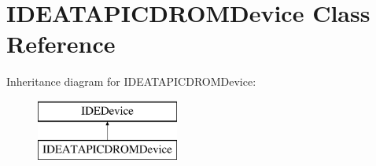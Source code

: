 \hypertarget{classIDEATAPICDROMDevice}{\section{I\-D\-E\-A\-T\-A\-P\-I\-C\-D\-R\-O\-M\-Device Class Reference}
\label{classIDEATAPICDROMDevice}
}
Inheritance diagram for I\-D\-E\-A\-T\-A\-P\-I\-C\-D\-R\-O\-M\-Device\-:\begin{figure}[H]
\begin{center}
\leavevmode
\includegraphics[height=2.000000cm]{classIDEATAPICDROMDevice}
\end{center}
\end{figure}
